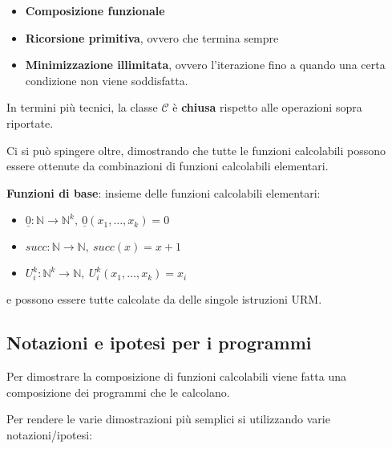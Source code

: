 \begin{itemize}
\item
  \textbf{Composizione funzionale}
\item
  \textbf{Ricorsione primitiva}, ovvero che termina sempre
\item
  \textbf{Minimizzazione illimitata}, ovvero l'iterazione fino a
  quando una certa condizione non viene soddisfatta.
\end{itemize}

In termini più tecnici, la classe $\mathcal{C}$ è \textbf{chiusa}
rispetto alle operazioni sopra riportate.

Ci si può spingere oltre, dimostrando che tutte le funzioni calcolabili
possono essere ottenute da combinazioni di funzioni calcolabili
elementari.

\textbf{Funzioni di base}: insieme delle funzioni calcolabili
elementari:

\begin{itemize}
\item
  $\underline{0} : \mathbb{N} \rightarrow \mathbb{N}^k,\: \underline{0}(x_1,\ldots{},x_k) = 0$
\item
  $succ: \mathbb{N} \rightarrow \mathbb{N},\: succ(x) = x+1$
\item
  $U_i^k : \mathbb{N}^k \rightarrow \mathbb{N},\: U_i^k(x_1,\ldots,x_k) = x_i$
\end{itemize}

e possono essere tutte calcolate da delle singole istruzioni URM.

\subsection{Notazioni e ipotesi per i programmi}\label{notazioni-e-ipotesi-per-i-programmi}

Per dimostrare la composizione di funzioni calcolabili viene fatta una
composizione dei programmi che le calcolano.

Per rendere le varie dimostrazioni più semplici si utilizzando varie
notazioni/ipotesi:

